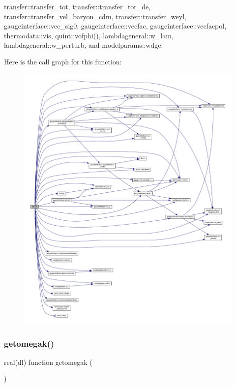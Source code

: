 transfer\+::transfer\+\_\+tot, transfer\+::transfer\+\_\+tot\+\_\+de, transfer\+::transfer\+\_\+vel\+\_\+baryon\+\_\+cdm, transfer\+::transfer\+\_\+weyl, gaugeinterface\+::vec\+\_\+sig0, gaugeinterface\+::vecfac, gaugeinterface\+::vecfacpol, thermodata\+::vis, quint\+::vofphi(), lambdageneral\+::w\+\_\+lam, lambdageneral\+::w\+\_\+perturb, and modelparams\+::wdgc.

Here is the call graph for this function\+:
\nopagebreak
\begin{figure}[H]
\begin{center}
\leavevmode
\includegraphics[width=350pt]{equations__bde__v3_8f90_a1c228811398a4401bb57d778911a13df_cgraph}
\end{center}
\end{figure}
\mbox{\label{equations__bde__v3_8f90_a2c95a3b42a68aa87a21097ce3ff8bbe6}} 
\subsubsection{\texorpdfstring{getomegak()}{getomegak()}}
{\footnotesize\ttfamily real(dl) function getomegak (\begin{DoxyParamCaption}{ }\end{DoxyParamCaption})}



